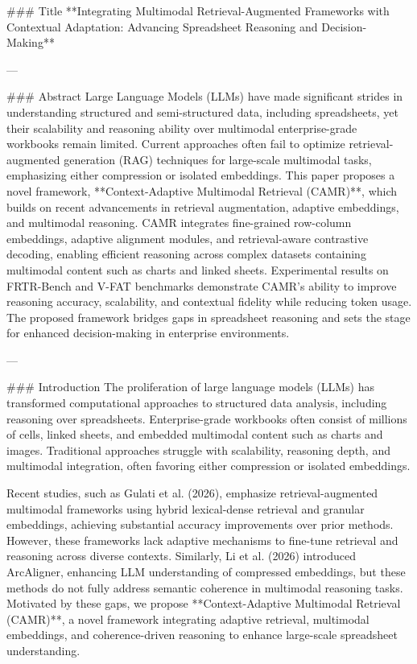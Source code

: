 ### Title  
**Integrating Multimodal Retrieval-Augmented Frameworks with Contextual Adaptation: Advancing Spreadsheet Reasoning and Decision-Making**

---

### Abstract  
Large Language Models (LLMs) have made significant strides in understanding structured and semi-structured data, including spreadsheets, yet their scalability and reasoning ability over multimodal enterprise-grade workbooks remain limited. Current approaches often fail to optimize retrieval-augmented generation (RAG) techniques for large-scale multimodal tasks, emphasizing either compression or isolated embeddings. This paper proposes a novel framework, **Context-Adaptive Multimodal Retrieval (CAMR)**, which builds on recent advancements in retrieval augmentation, adaptive embeddings, and multimodal reasoning. CAMR integrates fine-grained row-column embeddings, adaptive alignment modules, and retrieval-aware contrastive decoding, enabling efficient reasoning across complex datasets containing multimodal content such as charts and linked sheets. Experimental results on FRTR-Bench and V-FAT benchmarks demonstrate CAMR's ability to improve reasoning accuracy, scalability, and contextual fidelity while reducing token usage. The proposed framework bridges gaps in spreadsheet reasoning and sets the stage for enhanced decision-making in enterprise environments.

---

### Introduction  
The proliferation of large language models (LLMs) has transformed computational approaches to structured data analysis, including reasoning over spreadsheets. Enterprise-grade workbooks often consist of millions of cells, linked sheets, and embedded multimodal content such as charts and images. Traditional approaches struggle with scalability, reasoning depth, and multimodal integration, often favoring either compression or isolated embeddings.  

Recent studies, such as Gulati et al. (2026), emphasize retrieval-augmented multimodal frameworks using hybrid lexical-dense retrieval and granular embeddings, achieving substantial accuracy improvements over prior methods. However, these frameworks lack adaptive mechanisms to fine-tune retrieval and reasoning across diverse contexts. Similarly, Li et al. (2026) introduced ArcAligner, enhancing LLM understanding of compressed embeddings, but these methods do not fully address semantic coherence in multimodal reasoning tasks. Motivated by these gaps, we propose **Context-Adaptive Multimodal Retrieval (CAMR)**, a novel framework integrating adaptive retrieval, multimodal embeddings, and coherence-driven reasoning to enhance large-scale spreadsheet understanding.

